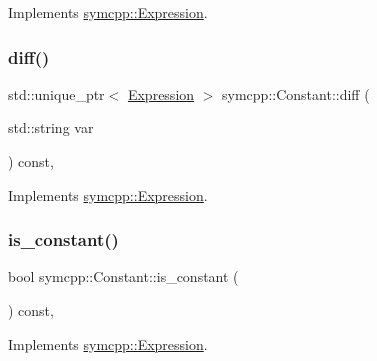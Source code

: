 Implements \mbox{\hyperlink{classsymcpp_1_1Expression_a2e7de5a295ccf0efdc9b34cea7ba3d0b}{symcpp\+::\+Expression}}.

\mbox{\label{classsymcpp_1_1Constant_a19dd15712ce8630b758766e6478dec58}} 
\subsubsection{\texorpdfstring{diff()}{diff()}}
{\footnotesize\ttfamily std\+::unique\+\_\+ptr$<$ \mbox{\hyperlink{classsymcpp_1_1Expression}{Expression}} $>$ symcpp\+::\+Constant\+::diff (\begin{DoxyParamCaption}\item[{std\+::string}]{var }\end{DoxyParamCaption}) const\hspace{0.3cm}{\ttfamily [override]}, {\ttfamily [virtual]}}



Implements \mbox{\hyperlink{classsymcpp_1_1Expression_a032fe8da79d5e231ca2d21a201c8f32d}{symcpp\+::\+Expression}}.

\mbox{\label{classsymcpp_1_1Constant_af1ae4532a85ec5c5ed55ed8d69be68b3}} 
\subsubsection{\texorpdfstring{is\_constant()}{is\_constant()}}
{\footnotesize\ttfamily bool symcpp\+::\+Constant\+::is\+\_\+constant (\begin{DoxyParamCaption}{ }\end{DoxyParamCaption}) const\hspace{0.3cm}{\ttfamily [override]}, {\ttfamily [virtual]}}



Implements \mbox{\hyperlink{classsymcpp_1_1Expression_a30db7917c8948e22330cbe8259caeae2}{symcpp\+::\+Expression}}.

\mbox{\label{classsymcpp_1_1Constant_a8c5e1e1b0cb2131d6f20b118f32a223f}} 
